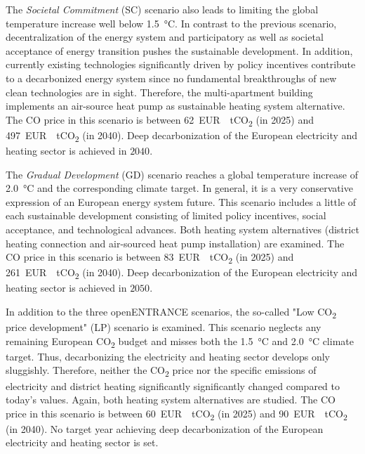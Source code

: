 The \textit{Societal Commitment} (SC) scenario also leads to limiting the global temperature increase well below \SI{1.5}{\degreeCelsius}. In contrast to the previous scenario, decentralization of the energy system and participatory as well as societal acceptance of energy transition pushes the sustainable development. In addition, currently existing technologies significantly driven by policy incentives contribute to a decarbonized energy system since no fundamental breakthroughs of new clean technologies are in sight. Therefore, the multi-apartment building implements an air-source heat pump as sustainable heating system alternative. The CO price in this scenario is between \SI{62}{EUR \per tCO_{2}} (in 2025) and \SI{497}{EUR \per tCO_{2}} (in 2040). Deep decarbonization of the European electricity and heating sector is achieved in $2040$.\vspace{0.5cm}

The \textit{Gradual Development} (GD) scenario reaches a global temperature increase of \SI{2.0}{\degreeCelsius} and the corresponding climate target. In general, it is a very conservative expression of an European energy system future. This scenario includes a little of each sustainable development consisting of limited policy incentives, social acceptance, and technological advances. Both heating system alternatives (district heating connection and air-sourced heat pump installation) are examined. The CO price in this scenario is between \SI{83}{EUR \per tCO_{2}} (in 2025) and \SI{261}{EUR \per tCO_{2}} (in 2040). Deep decarbonization of the European electricity and heating sector is achieved in $2050$.\vspace{0.5cm}

In addition to the three openENTRANCE scenarios, the so-called "Low CO\textsubscript{2} price development" (LP) scenario is examined. This scenario neglects any remaining European CO\textsubscript{2} budget and misses both the  \SI{1.5}{\degreeCelsius} and \SI{2.0}{\degreeCelsius} climate target. Thus, decarbonizing the electricity and heating sector develops only sluggishly. Therefore, neither the CO\textsubscript{2} price nor the specific emissions of electricity and district heating significantly significantly changed compared to today's values. Again, both heating system alternatives are studied. The CO price in this scenario is between \SI{60}{EUR \per tCO_{2}} (in 2025) and \SI{90}{EUR \per tCO_{2}} (in 2040). No target year achieving deep decarbonization of the European electricity and heating sector is set.

